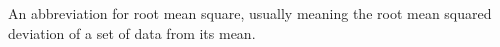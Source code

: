 An abbreviation for root mean square, usually meaning
the root mean squared deviation of a set of data from
its mean.